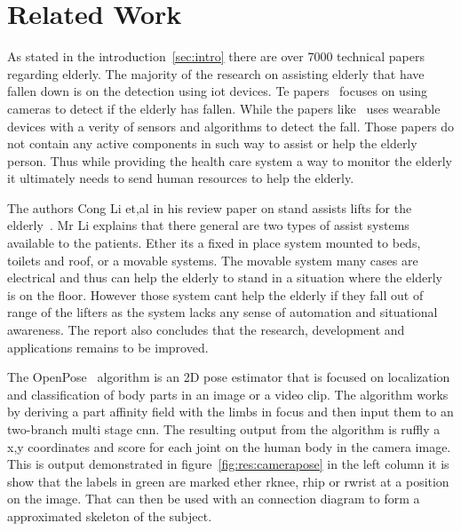 \section{Related Work}
\label{sec:related_work}
As stated in the introduction~\ref{sec:intro} there are over 7000 technical papers regarding elderly.
The majority of the research on assisting elderly that have fallen down is on the detection using \ac{iot} devices.
Te papers~\cite{Rac2020good,Kong2018deapth,xia2017deapth,Barabas2019kinect} focuses on using cameras to detect if the elderly has fallen.
While the papers like~\cite{Ostadabbas2016falldetect,Hariharan2019remote,Balli2018smart} uses wearable devices with a verity of sensors and algorithms to detect the fall.
Those papers do not contain any active components in such way to assist or help the elderly person.
Thus while providing the health care system a way to monitor the elderly it ultimately needs to send human resources to help the elderly.

The authors Cong Li et,al in his review paper on stand assists lifts for the elderly~\cite{Li2016assist}.
Mr Li explains that there general are two types of assist systems available to the patients.
Ether its a fixed in place system mounted to beds, toilets and roof, or a movable systems.
The movable system many cases are electrical and thus can help the elderly to stand in a situation where the elderly is on the floor.
However those system cant help the elderly if they fall out of range of the lifters as the system lacks any sense of automation and situational awareness.
The report also concludes that the research, development and applications remains to be improved.


The OpenPose~\cite{cao2017realtime} algorithm is an 2D pose estimator that is focused on localization and classification of body parts in an image or a video clip.
The algorithm works by deriving a part affinity field with the limbs in focus and then input them to an two-branch multi stage \ac{cnn}.
The resulting output from the \openpose algorithm is ruffly a x,y coordinates and score for each joint on the human body in the camera image.
This is output demonstrated in figure~\ref{fig:res:camerapose} in the left column it is show that the labels in green are marked ether rknee, rhip or rwrist at a position on the image.
That can then be used with an connection diagram to form a approximated skeleton of the subject.

